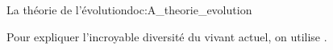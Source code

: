 \begin{doc}{La théorie de l'évolution}{doc:A_theorie_evolution}
  
  Pour expliquer l'incroyable diversité du vivant actuel, on utilise .

  \begin{listePoints}
    \item {}
    \item {}
    \item {}
  \end{listePoints}
\end{doc}

  
  
